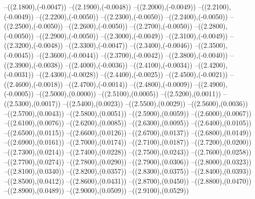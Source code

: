 {	--({\sx*(2.1800)},{\sy*(-0.0047)})
	--({\sx*(2.1900)},{\sy*(-0.0048)})
	--({\sx*(2.2000)},{\sy*(-0.0049)})
	--({\sx*(2.2100)},{\sy*(-0.0049)})
	--({\sx*(2.2200)},{\sy*(-0.0050)})
	--({\sx*(2.2300)},{\sy*(-0.0050)})
	--({\sx*(2.2400)},{\sy*(-0.0050)})
	--({\sx*(2.2500)},{\sy*(-0.0050)})
	--({\sx*(2.2600)},{\sy*(-0.0050)})
	--({\sx*(2.2700)},{\sy*(-0.0050)})
	--({\sx*(2.2800)},{\sy*(-0.0050)})
	--({\sx*(2.2900)},{\sy*(-0.0050)})
	--({\sx*(2.3000)},{\sy*(-0.0049)})
	--({\sx*(2.3100)},{\sy*(-0.0049)})
	--({\sx*(2.3200)},{\sy*(-0.0048)})
	--({\sx*(2.3300)},{\sy*(-0.0047)})
	--({\sx*(2.3400)},{\sy*(-0.0046)})
	--({\sx*(2.3500)},{\sy*(-0.0045)})
	--({\sx*(2.3600)},{\sy*(-0.0044)})
	--({\sx*(2.3700)},{\sy*(-0.0042)})
	--({\sx*(2.3800)},{\sy*(-0.0040)})
	--({\sx*(2.3900)},{\sy*(-0.0038)})
	--({\sx*(2.4000)},{\sy*(-0.0036)})
	--({\sx*(2.4100)},{\sy*(-0.0034)})
	--({\sx*(2.4200)},{\sy*(-0.0031)})
	--({\sx*(2.4300)},{\sy*(-0.0028)})
	--({\sx*(2.4400)},{\sy*(-0.0025)})
	--({\sx*(2.4500)},{\sy*(-0.0021)})
	--({\sx*(2.4600)},{\sy*(-0.0018)})
	--({\sx*(2.4700)},{\sy*(-0.0014)})
	--({\sx*(2.4800)},{\sy*(-0.0009)})
	--({\sx*(2.4900)},{\sy*(-0.0005)})
	--({\sx*(2.5000)},{\sy*(0.0000)})
	--({\sx*(2.5100)},{\sy*(0.0005)})
	--({\sx*(2.5200)},{\sy*(0.0011)})
	--({\sx*(2.5300)},{\sy*(0.0017)})
	--({\sx*(2.5400)},{\sy*(0.0023)})
	--({\sx*(2.5500)},{\sy*(0.0029)})
	--({\sx*(2.5600)},{\sy*(0.0036)})
	--({\sx*(2.5700)},{\sy*(0.0043)})
	--({\sx*(2.5800)},{\sy*(0.0051)})
	--({\sx*(2.5900)},{\sy*(0.0059)})
	--({\sx*(2.6000)},{\sy*(0.0067)})
	--({\sx*(2.6100)},{\sy*(0.0076)})
	--({\sx*(2.6200)},{\sy*(0.0085)})
	--({\sx*(2.6300)},{\sy*(0.0095)})
	--({\sx*(2.6400)},{\sy*(0.0105)})
	--({\sx*(2.6500)},{\sy*(0.0115)})
	--({\sx*(2.6600)},{\sy*(0.0126)})
	--({\sx*(2.6700)},{\sy*(0.0137)})
	--({\sx*(2.6800)},{\sy*(0.0149)})
	--({\sx*(2.6900)},{\sy*(0.0161)})
	--({\sx*(2.7000)},{\sy*(0.0174)})
	--({\sx*(2.7100)},{\sy*(0.0187)})
	--({\sx*(2.7200)},{\sy*(0.0200)})
	--({\sx*(2.7300)},{\sy*(0.0214)})
	--({\sx*(2.7400)},{\sy*(0.0228)})
	--({\sx*(2.7500)},{\sy*(0.0243)})
	--({\sx*(2.7600)},{\sy*(0.0258)})
	--({\sx*(2.7700)},{\sy*(0.0274)})
	--({\sx*(2.7800)},{\sy*(0.0290)})
	--({\sx*(2.7900)},{\sy*(0.0306)})
	--({\sx*(2.8000)},{\sy*(0.0323)})
	--({\sx*(2.8100)},{\sy*(0.0340)})
	--({\sx*(2.8200)},{\sy*(0.0357)})
	--({\sx*(2.8300)},{\sy*(0.0375)})
	--({\sx*(2.8400)},{\sy*(0.0393)})
	--({\sx*(2.8500)},{\sy*(0.0412)})
	--({\sx*(2.8600)},{\sy*(0.0431)})
	--({\sx*(2.8700)},{\sy*(0.0450)})
	--({\sx*(2.8800)},{\sy*(0.0470)})
	--({\sx*(2.8900)},{\sy*(0.0489)})
	--({\sx*(2.9000)},{\sy*(0.0509)})
	--({\sx*(2.9100)},{\sy*(0.0529)})
}
